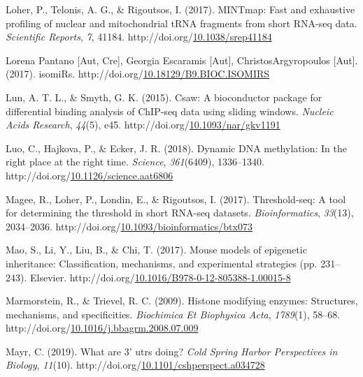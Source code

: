 \documentclass[12pt,twoside]{reedthesis}
\newlength{\cslhangindent}
\newenvironment{CSLReferences}[2] %
 {%
  \setlength{\parindent}{0pt}
  \ifodd #1 \everypar{\setlength{\hangindent}{\cslhangindent}}\ignorespaces\fi
  \ifnum #2 > 0
  \setlength{\parskip}{#2\baselineskip}
  \fi
 }%
 {}
\begin{document}
\begin{CSLReferences}{1}{0}
\leavevmode{}%
Loher, P., Telonis, A. G., \& Rigoutsos, I. (2017). MINTmap: Fast and exhaustive profiling of nuclear and mitochondrial tRNA fragments from short RNA-seq data. \emph{Scientific Reports}, \emph{7}, 41184. http://doi.org/\href{https://doi.org/10.1038/srep41184}{10.1038/srep41184}

\leavevmode{}%
Lorena Pantano {[}Aut, Cre{]}, Georgia Escaramis {[}Aut{]}, ChristosArgyropoulos {[}Aut{]}. (2017). isomiRs. http://doi.org/\href{https://doi.org/10.18129/B9.BIOC.ISOMIRS}{10.18129/B9.BIOC.ISOMIRS}

\leavevmode{}%
Lun, A. T. L., \& Smyth, G. K. (2015). Csaw: A bioconductor package for differential binding analysis of ChIP-seq data using sliding windows. \emph{Nucleic Acids Research}, \emph{44}(5), e45. http://doi.org/\href{https://doi.org/10.1093/nar/gkv1191}{10.1093/nar/gkv1191}

\leavevmode{}%
Luo, C., Hajkova, P., \& Ecker, J. R. (2018). Dynamic DNA methylation: In the right place at the right time. \emph{Science}, \emph{361}(6409), 1336--1340. http://doi.org/\href{https://doi.org/10.1126/science.aat6806}{10.1126/science.aat6806}

\leavevmode{}%
Magee, R., Loher, P., Londin, E., \& Rigoutsos, I. (2017). Threshold-seq: A tool for determining the threshold in short RNA-seq datasets. \emph{Bioinformatics}, \emph{33}(13), 2034--2036. http://doi.org/\href{https://doi.org/10.1093/bioinformatics/btx073}{10.1093/bioinformatics/btx073}

\leavevmode{}%
Mao, S., Li, Y., Liu, B., \& Chi, T. (2017). Mouse models of epigenetic inheritance: Classification, mechanisms, and experimental strategies (pp. 231--243). Elsevier. http://doi.org/\href{https://doi.org/10.1016/B978-0-12-805388-1.00015-8}{10.1016/B978-0-12-805388-1.00015-8}

\leavevmode{}%
Marmorstein, R., \& Trievel, R. C. (2009). Histone modifying enzymes: Structures, mechanisms, and specificities. \emph{Biochimica Et Biophysica Acta}, \emph{1789}(1), 58--68. http://doi.org/\href{https://doi.org/10.1016/j.bbagrm.2008.07.009}{10.1016/j.bbagrm.2008.07.009}

\leavevmode{}%
Mayr, C. (2019). What are 3' utrs doing? \emph{Cold Spring Harbor Perspectives in Biology}, \emph{11}(10). http://doi.org/\href{https://doi.org/10.1101/cshperspect.a034728}{10.1101/cshperspect.a034728}


\end{CSLReferences}
\end{document}
